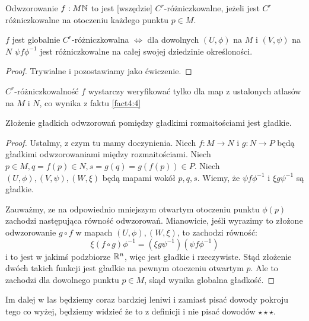 \begin{definition}
    Odwzorowanie $f:M\mathbb{N}$ to jest [wszędzie] $C^r$-różniczkowalne, jeżeli jest $C^r$ różniczkowalne na otoczeniu każdego punktu $p\in M$.
\end{definition}

\begin{fact}\label{fact4:4}
    $f$ jest globalnie $C^r$-różniczkowalna $\iff$ dla dowolnych $(U,\phi)$ na $M$ i $(V,\psi)$ na $N$ $\psi f\phi^{-1}$ jest różniczkowalne na całej swojej dziedzinie określoności.
\end{fact}
\begin{proof}
Trywialne i pozostawiamy jako ćwiczenie.
\end{proof}

\begin{remark}[weryfikowalnie $C^r$]
    $C^r$-różniczkowalność $f$ wystarczy weryfikować tylko dla map z ustalonych atlasów na $M$ i $N$, co wynika z faktu \ref{fact4:4}
\end{remark}

\begin{fact}
    Złożenie gładkich odwzorowań pomiędzy gładkimi rozmaitościami jest gładkie.
\end{fact}

\begin{proof}
    Ustalmy, z czym tu mamy doczynienia. Niech $f:M\to N$ i $g:N\to P$ będą gładkimi odwzorowaniami między rozmaitościami. Niech $p\in M, q=f(p)\in N, s=g(q)=g(f(p))\in P$. Niech $(U,\phi),(V,\psi),(W,\xi)$ będą mapami wokół $p,q,s$. Wiemy, że $\psi f\phi^{-1}$ i $\xi g\psi^{-1}$ są gładkie. 

    Zauważmy, ze na odpowiednio mniejszym otwartym otoczeniu punktu $\phi(p)$ zachodzi następująca równość odwzorowań. Mianowicie, jeśli wyrazimy to złożone odwzorowanie $g\circ f$ w mapach $(U,\phi),(W,\xi)$, to zachodzi równość:
    $$\xi(f\circ g)\phi^{-1}=(\xi g\psi^{-1})(\psi f\phi^{-1})$$
    i to jest w jakimś podzbiorze $\mathbb{R}^n$, więc jest gładkie i rzeczywiste. Stąd złożenie dwóch takich funkcji jest gładkie na pewnym otoczeniu otwartym $p$. Ale to zachodzi dla dowolnego punktu $p\in M$, skąd wynika globalna gładkość.
\end{proof}

Im dalej w las będziemy coraz bardziej leniwi i zamiast pisać dowody pokroju tego co wyżej, będziemy widzieć że to z definicji i nie pisać dowodów $\star\star\star$.

